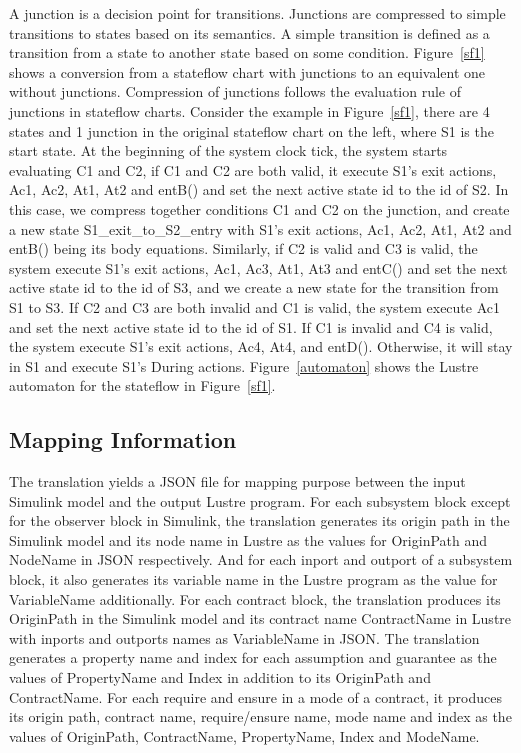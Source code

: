 \documentclass{article}
\begin{document}
A junction is a decision point for transitions. 
Junctions are compressed to simple transitions to states based on its semantics. 
A simple transition is defined as a transition from a state to another state based on some condition. 
Figure~\ref{sf1} shows a conversion from a stateflow chart with junctions to an equivalent one without junctions.
Compression of junctions follows the evaluation rule of junctions in stateflow charts.
Consider the example in Figure~\ref{sf1}, there are 4 states and 1 junction in the original stateflow chart on the left, where S1 is the start state.
At the beginning of the system clock tick, the system starts evaluating C1 and C2, if C1 and C2 are both valid, it execute S1's exit actions, Ac1, Ac2, At1, At2 and entB() and set the next active state id to the id of S2. 
In this case, we compress together conditions C1 and C2 on the junction, and create a new state \textsf{S1\_exit\_to\_S2\_entry} with S1's exit actions, Ac1, Ac2, At1, At2 and entB() being its body equations. 
Similarly, if C2 is valid and C3 is valid, the system execute S1's exit actions, Ac1, Ac3, At1, At3 and entC() and set the next active state id to the id of S3, and we create a new state for the transition from S1 to S3.
If C2 and C3 are both invalid and C1 is valid, the system execute Ac1 and set the next active state id to the id of S1.
If C1 is invalid and C4 is valid, the system execute S1's exit actions, Ac4, At4, and entD().  
Otherwise, it will stay in S1 and execute S1's During actions. 
Figure~\ref{automaton} shows the Lustre automaton for the stateflow in Figure~\ref{sf1}.
\subsection{Mapping Information}

The translation yields a JSON file for mapping purpose between the input Simulink model and the output Lustre program. 
For each subsystem block except for the observer block in Simulink, the translation generates its origin path in the Simulink model and its node name in Lustre as the values for \textsf{OriginPath} and \textsf{NodeName} in JSON respectively.
And for each inport and outport of a subsystem block, it also generates its variable name in the Lustre program as the value for \textsf{VariableName} additionally.
For each contract block, the translation produces its \textsf{OriginPath} in the Simulink model and its contract name \textsf{ContractName} in Lustre with inports and outports names as \textsf{VariableName} in JSON.
The translation generates a property name and index for each assumption and guarantee as the values of \textsf{PropertyName} and \textsf{Index} in addition to its \textsf{OriginPath} and \textsf{ContractName}.
For each require and ensure in a mode of a contract, it produces its origin path, contract name, require/ensure name, mode name and index as the values of 
\textsf{OriginPath}, \textsf{ContractName}, \textsf{PropertyName}, \textsf{Index} and \textsf{ModeName}.
\end{document}
